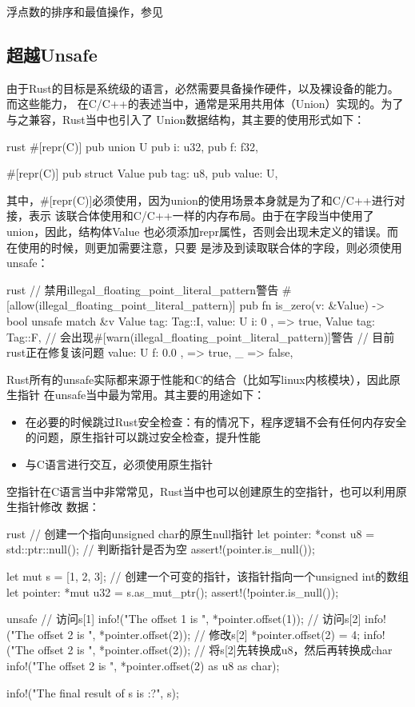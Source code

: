 浮点数的排序和最值操作，参见

\subsection{超越Unsafe}
由于Rust的目标是系统级的语言，必然需要具备操作硬件，以及裸设备的能力。而这些能力，
在C/C++的表述当中，通常是采用共用体（Union）实现的。为了与之兼容，Rust当中也引入了
Union数据结构，其主要的使用形式如下：
\begin{code-block}{rust}
#[repr(C)]
pub union U {
    pub i: u32,
    pub f: f32,
}

#[repr(C)]
pub struct Value {
    pub tag: u8,
    pub value: U,
}
\end{code-block}
其中，\#[repr(C)]必须使用，因为union的使用场景本身就是为了和C/C++进行对接，表示
该联合体使用和C/C++一样的内存布局。由于在字段当中使用了union，因此，结构体Value
也必须添加repr属性，否则会出现未定义的错误。而在使用的时候，则更加需要注意，只要
是涉及到读取联合体的字段，则必须使用unsafe：
\begin{code-block}{rust}
// 禁用illegal_floating_point_literal_pattern警告
#[allow(illegal_floating_point_literal_pattern)]
pub fn is_zero(v: &Value) -> bool {
    unsafe {
        match &v {
            Value {
                tag: Tag::I,
                value: U { i: 0 },
            } => true,
            Value {
                tag: Tag::F,
                // 会出现#[warn(illegal_floating_point_literal_pattern)]警告
                // 目前rust正在修复该问题
                value: U { f: 0.0 },
            } => true,
            _ => false,
        }
    }
}
\end{code-block}

Rust所有的unsafe实际都来源于性能和C的结合（比如写linux内核模块），因此原生指针
在unsafe当中最为常用。其主要的用途如下：
\begin{itemize}
  \item 在必要的时候跳过Rust安全检查：有的情况下，程序逻辑不会有任何内存安全的问题，原生指针可以跳过安全检查，提升性能
  \item 与C语言进行交互，必须使用原生指针
\end{itemize}

空指针在C语言当中非常常见，Rust当中也可以创建原生的空指针，也可以利用原生指针修改
数据：
\begin{code-block}{rust}
// 创建一个指向unsigned char的原生null指针
let pointer: *const u8 = std::ptr::null();
// 判断指针是否为空
assert!(pointer.is_null());

let mut s = [1, 2, 3];
// 创建一个可变的指针，该指针指向一个unsigned int的数组
let pointer: *mut u32 = s.as_mut_ptr();
assert!(!pointer.is_null());

unsafe {
    // 访问s[1]
    info!("The offset 1 is {}", *pointer.offset(1));
    // 访问s[2]
    info!("The offset 2 is {}", *pointer.offset(2));
    // 修改s[2]
    *pointer.offset(2) = 4;
    info!("The offset 2 is {}", *pointer.offset(2));
    // 将s[2]先转换成u8，然后再转换成char
    info!("The offset 2 is {}", *pointer.offset(2) as u8 as char);
}

info!("The final result of s is {:?}", s);
\end{code-block}

